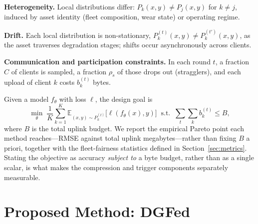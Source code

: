 \documentclass[journal]{IEEEtran}
\newcommand{\dgfed}{DGFed}
\begin{document}
\textbf{Heterogeneity.} Local distributions differ: $P_k(x, y) \neq P_j(x, y)$ for $k \neq j$, induced by asset identity (fleet composition, wear state) or operating regime.

\textbf{Drift.} Each local distribution is non-stationary, $P_k^{(t)}(x, y) \neq P_k^{(t')}(x, y)$, as the asset traverses degradation stages; shifts occur asynchronously across clients.

\textbf{Communication and participation constraints.} In each round $t$, a fraction $C$ of clients is sampled, a fraction $\rho_s$ of those drops out (stragglers), and each upload of client $k$ costs $b_k^{(t)}$ bytes.

Given a model $f_\theta$ with loss $\ell$, the design goal is
\begin{equation}\label{eq:obj}
\min_{\theta}\; \frac{1}{K} \sum_{k=1}^{K} \mathbb{E}_{(x,y) \sim P_k^{(t)}} \big[ \ell(f_\theta(x), y) \big] \;\; \text{s.t.} \;\; \sum_{t} \sum_{k} b_k^{(t)} \leq B,
\end{equation}
where $B$ is the total uplink budget. We report the empirical Pareto point each method reaches---RMSE against total uplink megabytes---rather than fixing $B$ a priori, together with the fleet-fairness statistics defined in Section~\ref{sec:metrics}. Stating the objective as accuracy \emph{subject to} a byte budget, rather than as a single scalar, is what makes the compression and trigger components separately measurable.

\section{Proposed Method: \dgfed{}}\label{sec:method}
\end{document}
